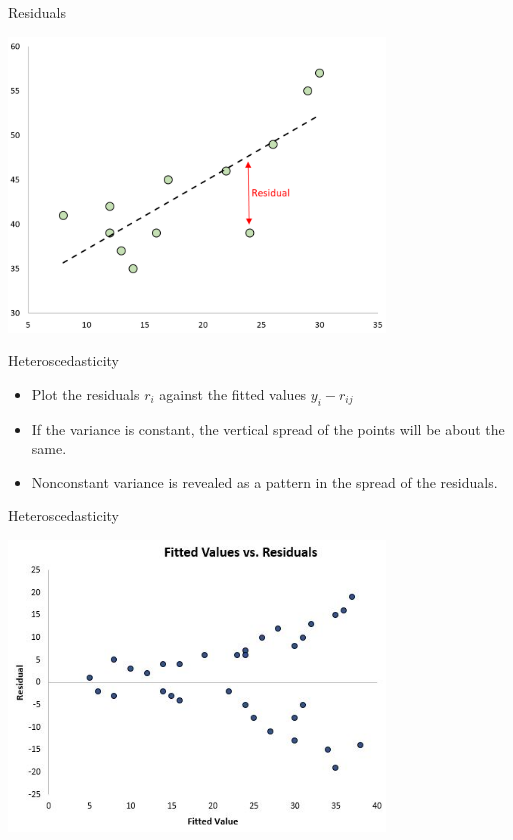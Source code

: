 \documentclass{beamer}
\begin{document}
\begin{frame}{Residuals}

\begin{center}
     \includegraphics[width=10cm]{../tex/figures/residuals1-1.png}
\end{center}

\end{frame}



\begin{frame}{Heteroscedasticity}
	\begin{itemize}
		\item Plot the residuals $r_{i}$ against the fitted values $y_{i} - r_{ij}$ 
		\item If the variance is constant, the vertical spread of the points will be about the same. 
		\item Nonconstant variance is revealed as a pattern in the spread of the residuals.
	\end{itemize}
\end{frame}

\begin{frame}{Heteroscedasticity}

\begin{center}
     \includegraphics[width=10cm]{../tex/figures/heteroscedastisity.jpg}
\end{center}

\end{frame}
\end{document}
